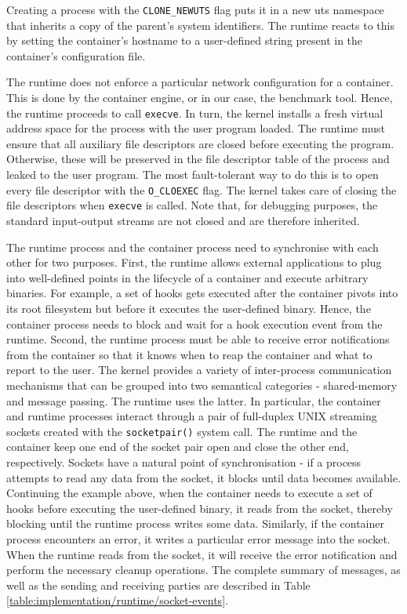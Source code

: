 Creating a process with the \verb|CLONE_NEWUTS| flag puts it in a new uts namespace that inherits 
a copy of the parent's system identifiers. The runtime reacts to this by setting the container's
hostname to a user-defined string present in the container's configuration file.

The runtime does not enforce a particular network configuration for a container. This is done 
by the container engine, or in our case, the benchmark tool. Hence, the runtime proceeds 
to call \verb|execve|. In turn, the kernel installs a fresh virtual address space 
for the process with the user program loaded. 
The runtime must ensure that all auxiliary file descriptors 
are closed before executing the program. Otherwise, these will be preserved in the file descriptor 
table of the process and leaked to the user program.
The most fault-tolerant way to do this is to open every file descriptor with the \verb|O_CLOEXEC|
flag. The kernel takes care of closing the file descriptors when \verb|execve| is called. 
Note that, for debugging purposes, the standard input-output streams are not closed and are 
therefore inherited. 

The runtime process and the container process need to synchronise with each other for two purposes.
First, the runtime allows external applications to plug into well-defined points in the 
lifecycle of a container and execute arbitrary binaries. For example, a set of hooks 
gets executed after the container pivots into its root filesystem but before it executes the user-defined 
binary. Hence, the container process needs to block and wait for a hook execution event from the 
runtime. Second, the runtime 
process must be able to receive error notifications from the container so that it knows 
when to reap the container and what to report to the user. The kernel provides a variety of 
inter-process communication mechanisms that can be grouped into two semantical categories - shared-memory 
and message passing. The runtime uses the latter. In particular, the container and runtime processes 
interact through a pair of full-duplex UNIX streaming sockets created with the \verb|socketpair()|
system call. The runtime and the container keep one end of the socket pair open 
and close the other end, respectively. Sockets have a natural point of synchronisation - if a 
process attempts to read any data from the socket, it blocks until data becomes available. Continuing the 
example above, when the container needs to execute a set of hooks before executing the user-defined 
binary, it reads from the socket, thereby blocking until the runtime process writes some data. Similarly, if the 
container process encounters an error, it writes a particular error message into the socket.
When the runtime reads from the socket, it will receive the error notification and perform 
the necessary cleanup operations. The complete summary of messages, as well as the sending and 
receiving parties are described in Table \ref{table:implementation/runtime/socket-events}.

